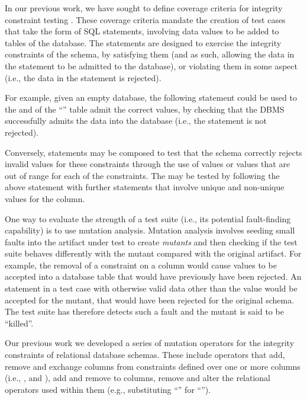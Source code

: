 In our previous work, we have sought to define coverage criteria for integrity constraint testing \cite{McMinn2015}. These coverage criteria mandate the creation of test cases that take the form of SQL \INSERT statements, involving data values to be added to tables of the database. The \INSERT statements are designed to exercise the integrity constraints of the schema, by satisfying them (and as such, allowing the data in the \INSERT statement to be admitted to the database), or violating them in some aspect (i.e., the data in the \INSERT statement is rejected).

For example, given an empty database, the following \INSERT statement could be used to the \NOTNULL and \CCs of the ``'' table admit the correct values, by checking that the DBMS successfully admits the data into the database (i.e., the \INSERT statement is not rejected).

\vspace{-0.5em}
\begin{center}
\end{center}
\vspace{-0.5em}

Conversely, \INSERT statements may be composed to test that the schema correctly rejects invalid values for these constraints through the use of \NULL values or values that are out of range for each of the \CHECK constraints. The \PK may be tested by following the above statement with further \INSERT statements that involve unique and non-unique values for the  column.

One way to evaluate the strength of a test suite (i.e., its potential fault-finding capability) is to use mutation analysis. Mutation analysis involves seeding small faults into the artifact under test to create {\it mutants} and then checking if the test suite behaves differently with the mutant compared with the original artifact. For example, the removal of a \NOTNULL constraint on a column would cause \NULL values to be accepted into a database table that would have previously have been rejected. An \INSERT statement in a test case with otherwise valid data other than the \NULL value would be accepted for the mutant, that would have been rejected for the original schema. The test suite has therefore detects such a fault and the mutant is said to be ``killed''.

Our previous work \cite{Kapfhammer2013,Wright2013,Wright2014} we developed a series of mutation operators for the integrity constraints of relational database schemas. These include operators that add, remove and exchange columns from constraints defined over one or more columns (i.e., \PKs, \FKs and \UCs), add and remove \NNCs to columns, remove \CCs and alter the relational operators used within them (e.g., substituting ``\sql{>}'' for ``\sql{>=}'').


